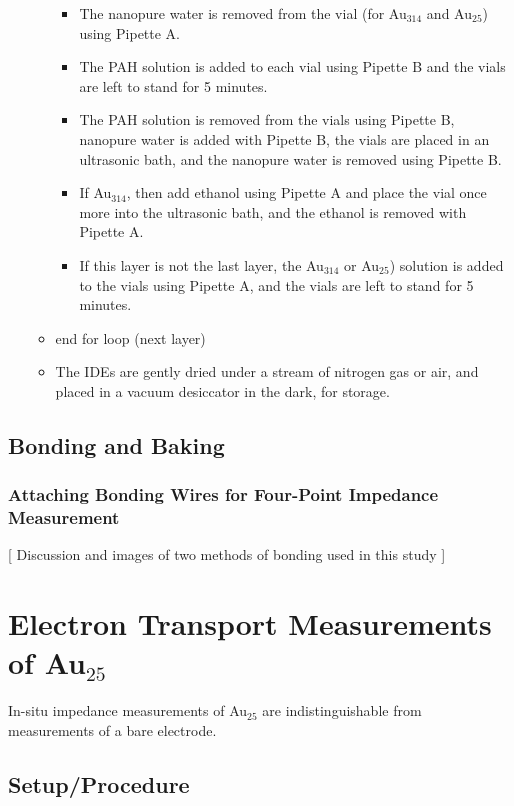 \documentclass[12pt,oneside,english]{article}
\begin{document}
\begin{itemize}
\begin{itemize}
\begin{itemize}
                \item The nanopure water is removed from the vial (for Au$_{314}$ and Au$_{25}$) using Pipette A.
                \item The PAH solution is added to each vial using Pipette B and the vials are left to stand for 5 minutes.
                \item The PAH solution is removed from the vials using Pipette B,  nanopure water is added with Pipette B, the vials are placed in an ultrasonic bath, and the nanopure water is removed using Pipette B.
                \item If Au$_{314}$, then add ethanol using Pipette A and place the vial once more into the ultrasonic bath, and the ethanol is removed with Pipette A.
                \item If this layer is not the last layer, the Au$_{314}$ or Au$_{25}$) solution is added to the vials using Pipette A, and the vials are left to stand for 5 minutes.
            \end{itemize}
            \item end for loop (next layer)
            \item The IDEs are gently dried under a stream of nitrogen gas or air, and placed in a vacuum desiccator in the dark, for storage.
        \end{itemize}
    \end{itemize}

    \subsection{Bonding and Baking}
    
    \subsubsection{Attaching Bonding Wires for Four-Point Impedance Measurement}
    
    [ Discussion and images of two methods of bonding used in this study ]
    
    
    \section{Electron Transport Measurements of Au$_{25}$}
    In-situ impedance measurements of Au$_{25}$ are indistinguishable from measurements of a bare electrode.
    \subsection{Setup/Procedure}
    
\end{document}
